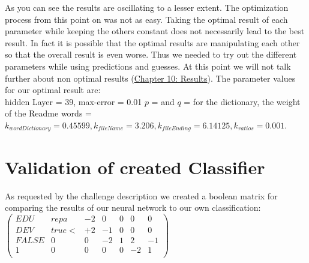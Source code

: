 \documentclass[paper=A4,pagesize=auto,12pt,headinclude=true,footinclude=true,BCOR=0mm,DIV=calc]{scrartcl}
\begin{document}
	As you can see the results are oscillating to a lesser extent. The optimization process from this point on was not as easy. Taking the optimal result of each parameter while keeping the others constant does not necessarily lead to the best result. In fact it is possible that the optimal results are manipulating each other so that the overall result is even worse. 
	Thus we needed to try out the different parameters while using predictions and guesses. At this point we will not talk further about non optimal results (\hyperref[src:recordingsOfResults]{Chapter 10: Results}). 
	The parameter values for our optimal result are:\\
	 hidden Layer = 39, max-error = 0.01 $p$ =  and $q$ = for the dictionary, the weight of the Readme words =  $k_{wordDictionary} = 0.45599, k_{fileName} = 3.206 , k_{fileEnding}= 6.14125, k_{ratios} = 0.001$.
	
	\section{Validation of created Classifier}
	As requested by the challenge description we created a boolean matrix for comparing the results of our neural network to our own classification:\\
	
	$\begin{pmatrix}
		EDU & repa & -2 & 0 & 0 & 0  & 0\\
		DEV & true< & +2 & -1 & 0 & 0 & 0 \\
		FALSE &  0 & 0  &-2 & 1 & 2 & -1\\
		1 & 0 & 0 & 0 & 0 & -2 & 1\\
	\end{pmatrix}$
	
\end{document}
